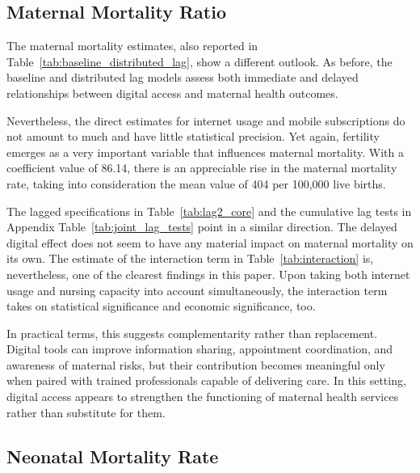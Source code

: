 \documentclass[12pt]{article}
\begin{document}
\begin{table}[H]
\centering
\label{tab:baseline_distributed_lag}

\end{table}


\begin{table}[H]
\centering
\label{tab:interaction}

\end{table}

\subsection{Maternal Mortality Ratio}

The maternal mortality estimates, also reported in Table~\ref{tab:baseline_distributed_lag}, show a different outlook. As before, the baseline and distributed lag models assess both immediate and delayed relationships between digital access and maternal health outcomes.

\medskip
Nevertheless, the direct estimates for internet usage and mobile subscriptions do not amount to much and have little statistical precision. Yet again, fertility emerges as a very important variable that influences maternal mortality. With a coefficient value of 86.14, there is an appreciable rise in the maternal mortality rate, taking into consideration the mean value of 404 per 100,000 live births.

\medskip
The lagged specifications in Table~\ref{tab:lag2_core} and the cumulative lag tests in Appendix Table~\ref{tab:joint_lag_tests} point in a similar direction. The delayed digital effect does not seem to have any material impact on maternal mortality on its own. The estimate of the interaction term in Table~\ref{tab:interaction} is, nevertheless, one of the clearest findings in this paper. Upon taking both internet usage and nursing capacity into account simultaneously, the interaction term takes on statistical significance and economic significance, too.

\medskip
In practical terms, this suggests complementarity rather than replacement. Digital tools can improve information sharing, appointment coordination, and awareness of maternal risks, but their contribution becomes meaningful only when paired with trained professionals capable of delivering care. In this setting, digital access appears to strengthen the functioning of maternal health services rather than substitute for them.

\subsection{Neonatal Mortality Rate}
\end{document}
